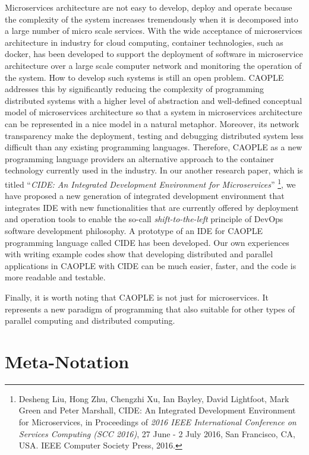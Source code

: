 \documentclass[english]{report}
\begin{document}
Microservices architecture are not easy to develop, deploy and operate because the complexity of the system increases tremendously when it is decomposed into a large number of micro scale services. With the wide acceptance of microservices architecture in industry for cloud computing, container technologies, such as docker, has been developed to support the deployment of software in microservice architecture over a large scale computer network and monitoring the operation of the system. How to develop such systems is still an open problem. CAOPLE addresses this by significantly reducing the complexity of programming distributed systems with a higher level of abstraction and well-defined conceptual model of microservices architecture so that a system in microservices architecture can be represented in a nice model in a natural metaphor. Moreover, its network transparency make the deployment, testing and debugging distributed system less difficult than any existing programming languages. Therefore, CAOPLE as a new programming language providers an alternative approach to the container technology currently used in the industry. In our another research paper, which is titled ``\emph{CIDE: An Integrated Development Environment for Microservices}'' \footnote{Desheng Liu,  Hong Zhu, Chengzhi Xu,  Ian Bayley, David Lightfoot, Mark Green and Peter Marshall, CIDE: An Integrated Development Environment for Microservices, in Proceedings of \emph{2016 IEEE International Conference on Services Computing (SCC 2016)},  27 June - 2 July 2016, San Francisco, CA, USA. IEEE Computer Society Press, 2016.},  we have proposed a new generation of integrated development environment that integrates IDE with new functionalities that are currently offered by deployment and operation tools to enable the so-call \emph{shift-to-the-left} principle of DevOps software development philosophy. A prototype of an IDE for CAOPLE programming language called CIDE has been developed. Our own experiences with writing example codes show that developing distributed and parallel applications in CAOPLE with CIDE can be much easier, faster, and the code is more readable and testable. 

Finally, it is worth noting that CAOPLE is not just for microservices. It represents a new paradigm of programming that also suitable for other types of parallel computing and distributed computing. 

\chapter{Meta-Notation} \label{sect: Ch2}
\end{document}
